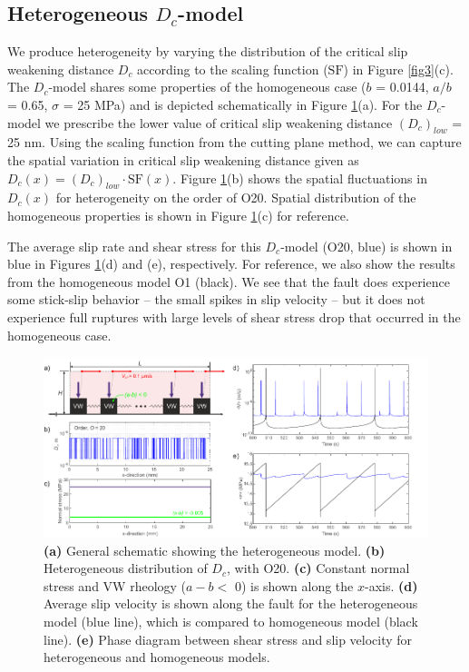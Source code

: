 \documentclass[preprint,1p, 10pt,authoryear]{elsarticle}
\begin{document}
\subsection{Heterogeneous $D_{c}$-model}
We produce heterogeneity by varying the distribution of the critical slip weakening distance $D_{c}$ according to the scaling function ($\mathrm{SF}$) in Figure \ref{fig3}(c). The $D_{c}$-model shares some properties of the homogeneous case ($b$ = 0.0144, $a/b$ = 0.65, $\sigma$ = 25 MPa) and is depicted schematically in Figure \ref{fig6}(a). For the $D_{c}$-model we prescribe the lower value of critical slip weakening distance $(D_{c})_{low}$ = 25 nm. Using the scaling function from the cutting plane method, we can capture the spatial variation in critical slip weakening distance given as $D_{c}(x) = (D_{c})_{low} \cdot \mathrm{SF}(x)$. Figure \ref{fig6}(b) shows the spatial fluctuations in $D_{c}(x)$ for heterogeneity on the order of O20. Spatial distribution of the homogeneous properties is shown in Figure \ref{fig6}(c) for reference.
 
The average slip rate and shear stress for this $D_{c}$-model (O20, blue) is shown in blue in Figures \ref{fig6}(d) and (e), respectively. For reference, we also show the results from the homogeneous model O1 (black). We see that the fault does experience some stick-slip behavior -- the small spikes in slip velocity -- but it does not experience full ruptures with large levels of shear stress drop that occurred in the homogeneous case. 

 \begin{figure}
	\centering
	\includegraphics{FIG6.pdf} 
	\caption{\textbf{(a)} General schematic showing the heterogeneous model. \textbf{(b)} Heterogeneous distribution of $D_{c}$, with O20. \textbf{(c)} Constant normal stress and VW rheology ($a-b <$ 0) is shown along the $x$-axis.  \textbf{(d)} Average slip velocity is shown along the fault for the heterogeneous model (blue line), which is compared to homogeneous model (black line). \textbf{(e)} Phase diagram between shear stress and slip velocity for heterogeneous and homogeneous models.}
	\label{fig6}
\end{figure}
 
\end{document}
